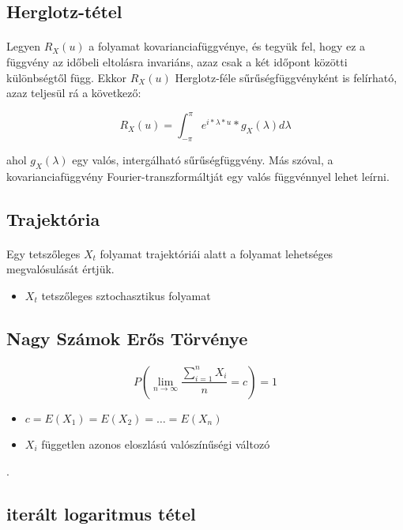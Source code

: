\documentclass[11pt,a4paper]{article}
\begin{document}
			\subsection{Herglotz-tétel}
				\paragraph{}
					Legyen $R_X (u)$ a folyamat kovarianciafüggvénye, és tegyük fel, hogy ez a függvény az időbeli eltolásra invariáns, azaz csak a két időpont közötti különbségtől függ. Ekkor $R_X (u)$ Herglotz-féle sűrűségfüggvényként is felírható, azaz teljesül rá a következő:

					$$R_X (u)=\int_{-\pi}^\pi e^{i*\lambda*u}*g_X(\lambda)d\lambda$$

					ahol $g_X(\lambda)$ egy valós, intergálható sűrűségfüggvény. Más szóval, a kovarianciafüggvény Fourier-transzformáltját egy valós függvénnyel lehet leírni.
			\subsection{Trajektória}
				\paragraph{}
					Egy tetszőleges $X_t$ folyamat trajektóriái alatt a folyamat lehetséges megvalósulását értjük.
					\begin{itemize}
						\item $X_t$ tetszőleges sztochasztikus folyamat
					\end{itemize}
			\subsection{Nagy Számok Erős Törvénye}
				\paragraph{}
					$$P\left( \lim_{n \to \infty} \dfrac{\sum_{i=1}^n X_i}{n} = c\right) = 1$$
					\begin{itemize}
						\item $c = E(X_1)= E(X_2) = \dots = E(X_n)$
						\item $X_i$ független azonos eloszlású valószínűségi változó
					\end{itemize}.
			\subsection{iterált logaritmus tétel}
\end{document}
